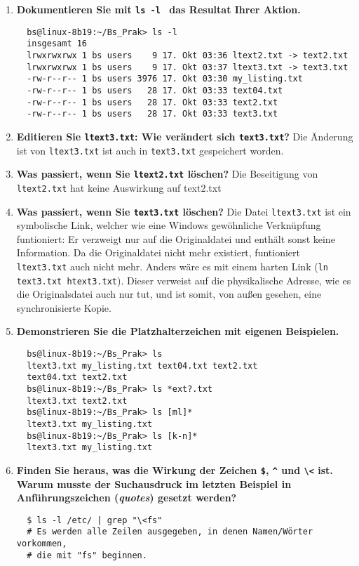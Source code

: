 \documentclass[
   draft=false
  ,paper=a4
  ,twoside=false
  ,fontsize=11pt
  ,headsepline
  ,BCOR10mm
  ,DIV11
  ,parskip=full+
]{scrartcl} %
\begin{document}
\begin{enumerate}
  \item \textbf{Dokumentieren Sie mit \texttt{ls -l } das Resultat Ihrer
  Aktion.}
  \begin{verbatim}
  bs@linux-8b19:~/Bs_Prak> ls -l
  insgesamt 16
  lrwxrwxrwx 1 bs users    9 17. Okt 03:36 ltext2.txt -> text2.txt
  lrwxrwxrwx 1 bs users    9 17. Okt 03:37 ltext3.txt -> text3.txt
  -rw-r--r-- 1 bs users 3976 17. Okt 03:30 my_listing.txt
  -rw-r--r-- 1 bs users   28 17. Okt 03:33 text04.txt
  -rw-r--r-- 1 bs users   28 17. Okt 03:33 text2.txt
  -rw-r--r-- 1 bs users   28 17. Okt 03:33 text3.txt
  \end{verbatim}

  \item \textbf{Editieren Sie \texttt{ltext3.txt}: Wie verändert sich
  \texttt{text3.txt}?}\newline
  Die Änderung ist von \texttt{ltext3.txt} ist auch in \texttt{text3.txt}
  gespeichert worden.

  \item \textbf{Was passiert, wenn Sie \texttt{ltext2.txt} löschen?}\newline
  Die Beseitigung von \texttt{ltext2.txt} hat keine Auswirkung auf text2.txt

  \item \textbf{Was passiert, wenn Sie \texttt{text3.txt} löschen?}\newline
  Die Datei \texttt{ltext3.txt} ist ein symbolische Link, welcher wie eine
  Windows gewöhnliche Verknüpfung funtioniert: Er verzweigt nur auf die
  Originaldatei und enthält sonst keine Information. Da die Originaldatei nicht
  mehr existiert, funtioniert \texttt{ltext3.txt} auch nicht mehr.
  Anders wäre es mit einem harten Link (\texttt{ln text3.txt htext3.txt}).
  Dieser verweist auf die physikalische Adresse, wie es die Originalsdatei auch
  nur tut, und ist somit, von außen gesehen, eine synchronisierte Kopie.

  \item \textbf{Demonstrieren Sie die Platzhalterzeichen mit eigenen
  Beispielen.}
  \begin{verbatim}
  bs@linux-8b19:~/Bs_Prak> ls
  ltext3.txt my_listing.txt text04.txt text2.txt
  text04.txt text2.txt
  bs@linux-8b19:~/Bs_Prak> ls *ext?.txt
  ltext3.txt text2.txt
  bs@linux-8b19:~/Bs_Prak> ls [ml]*
  ltext3.txt my_listing.txt
  bs@linux-8b19:~/Bs_Prak> ls [k-n]*
  ltext3.txt my_listing.txt
  \end{verbatim}


  \item \textbf{Finden Sie heraus, was die Wirkung der Zeichen \texttt{\$},
  \texttt{\^{}} und \texttt{\textbackslash <} ist. Warum musste der
  Suchausdruck im letzten Beispiel in Anführungszeichen (\emph{quotes})
  gesetzt werden?}
  \begin{verbatim}
  $ ls -l /etc/ | grep "\<fs"
  # Es werden alle Zeilen ausgegeben, in denen Namen/Wörter vorkommen,
  # die mit "fs" beginnen.


\end{verbatim}
\end{enumerate}
\end{document}
